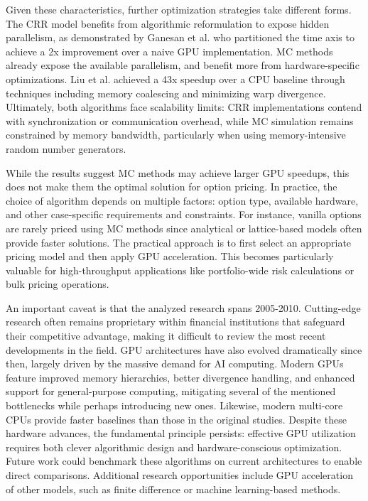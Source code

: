 \documentclass[english,12pt,a4paper,pdftex,sci,utf8]{aaltothesis}
\begin{document}
Given these characteristics, further optimization strategies take different forms. The CRR model benefits from algorithmic reformulation to expose hidden parallelism, as demonstrated by Ganesan et al. \cite{ganesan2009acceleration} who partitioned the time axis to achieve a 2x improvement over a naive GPU implementation. MC methods already expose the available parallelism, and benefit more from hardware-specific optimizations. Liu et al. \cite{liu2010efficient} achieved a 43x speedup over a CPU baseline through techniques including memory coalescing and minimizing warp divergence. Ultimately, both algorithms face scalability limits: CRR implementations contend with synchronization or communication overhead, while MC simulation remains constrained by memory bandwidth, particularly when using memory-intensive random number generators.

While the results suggest MC methods may achieve larger GPU speedups, this does not make them the optimal solution for option pricing. In practice, the choice of algorithm depends on multiple factors: option type, available hardware, and other case-specific requirements and constraints. For instance, vanilla options are rarely priced using MC methods since analytical or lattice-based models often provide faster solutions. The practical approach is to first select an appropriate pricing model and then apply GPU acceleration. This becomes particularly valuable for high-throughput applications like portfolio-wide risk calculations or bulk pricing operations.

An important caveat is that the analyzed research spans 2005-2010. Cutting-edge research often remains proprietary within financial institutions that safeguard their competitive advantage, making it difficult to review the most recent developments in the field. GPU architectures have also evolved dramatically since then, largely driven by the massive demand for AI computing. Modern GPUs feature improved memory hierarchies, better divergence handling, and enhanced support for general-purpose computing, mitigating several of the mentioned bottlenecks while perhaps introducing new ones. Likewise, modern multi-core CPUs provide faster baselines than those in the original studies. Despite these hardware advances, the fundamental principle persists: effective GPU utilization requires both clever algorithmic design and hardware-conscious optimization. Future work could benchmark these algorithms on current architectures to enable direct comparisons. Additional research opportunities include GPU acceleration of other models, such as finite difference or machine learning-based methods.
\end{document}
